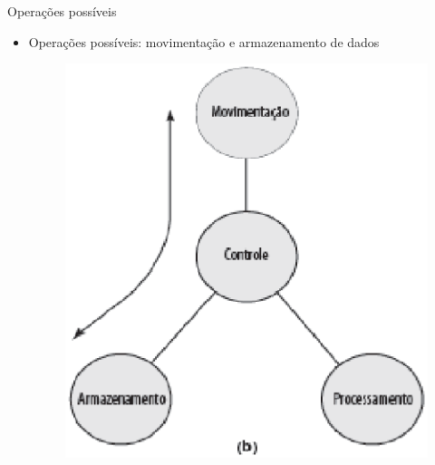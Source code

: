 \begin{slide}[toc=]{Operações possíveis}
    \begin{itemize}
       \item Operações possíveis: movimentação e armazenamento de dados
       \begin{figure}[h]
      \centering
      \includegraphics[height = 0.55\textheight]{figs/f1-2b.eps}
    \end{figure}
    \end{itemize}
 \end{slide}
 
